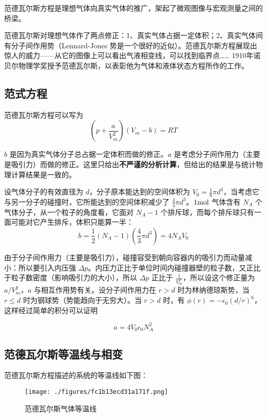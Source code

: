 
范德瓦尔斯方程是理想气体向真实气体的推广，架起了微观图像与宏观测量之间的桥梁。

范德瓦尔斯对理想气体作了两点修正：1、真实气体占据一定体积；2、真实气体间有分子间作用势（Lennard-Jones 势是一个很好的近似）。范德瓦尔斯方程展现出惊人的威力——从它的图像上可以看出气液相变线，可以找到临界点…… 1910年诺贝尔物理学奖授予范德瓦尔斯，以表彰他为气体和液体状态方程所作的工作。

\subsection{范式方程}
范德瓦尔斯方程可以写为
\begin{equation}
\left(p+\frac{a}{V_m^2}\right)(V_m-b)=RT
\end{equation}

$b$ 是因为真实气体分子总占据一定体积而做的修正。$a$ 是考虑分子间作用力（主要是吸引力）而做的修正。这里只给出\textbf{不严谨的分析计算}，但给出的结果是与统计物理计算结果是一致的。

设气体分子的有效直径为 $d$，分子原本能达到的空间体积为 $V_0=\frac{1}{6}\pi d^3$，当考虑它与另一分子的碰撞时，它所能达到的空间体积减少了 $\frac{4}{3}\pi d^3$。$1\rm mol$ 气体含有 $N_A$ 个气体分子，从一个粒子的角度看，它面对 $N_A-1$ 个排斥球，而每个排斥球只有一面可能对它产生排斥，体积只能算一半：
\begin{equation}
b=\frac{1}{2}(N_A-1)(\frac{4}{3}\pi d^3)=4N_A V_0
\end{equation}

由于分子间作用力（主要是吸引力），碰撞容受到朝向容器内的吸引力而动量减小：所以要引入内压强 $\Delta p$。内压力正比于单位时间内碰撞器壁的粒子数，又正比于粒子数密度（影响吸引力的大小），所以 $\Delta p$ 正比于 $\frac{1}{V_m^2}$，所以设这个修正量为 $a/V_m^2$，$a$ 与相互作用势有关。设分子间作用力在 $r>d$ 时为林纳德琼斯势，当 $r\le d$ 时为钢球势（势能趋向于无穷大）。当 $r>d$ 时，有 $\phi(r)=-\epsilon_0(d/r)^6$，这样经过简单的积分可以证明

\begin{equation}
a=4V_0\epsilon_0 N_A^2
\end{equation}

\subsection{范德瓦尔斯等温线与相变}
范德瓦尔斯方程描述的系统的等温线如下图：
\begin{figure}[ht]
\centering
\texttt{[image: ./figures/fc1b13ecd31a171f.png]}
\caption{范德瓦尔斯气体等温线} \label{fig_Vand_1}
\end{figure}

